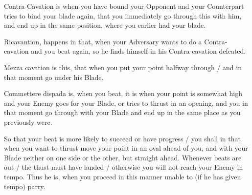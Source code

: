 \newpage


\newpage



Contra-Cavation is when you have bound your Opponent and your
Counterpart tries to bind your blade again, that you immediately go
through this with him, and end up in the same position, where you
earlier had your blade.


Ricavantion, happens in that, when your Adversary wants to do a
Contra-cavation and you beat again, so he finds himself in his
Contra-cavation defeated.


Mezza cavation is this, that when you put your point halfway through /
and in that moment go under his Blade.


Commettere dispada is, when you beat, it is when your point is
somewhat high and your Enemy goes for your Blade, or tries to thrust
in an opening, and you in that moment go through with your Blade and
end up in the same place as you previously were.


So that your beat is more likely to succeed or have progress / you
shall in that when you want to thrust move your point in an oval ahead
of you, and with your Blade neither on one side or the other, but
straight ahead. Whenever beats are out / the thust must have landed /
otherwise you will not reach your Enemy in tempo. Thus he is, when you
proceed in this manner unable to (if he has given tempo)  parry.

